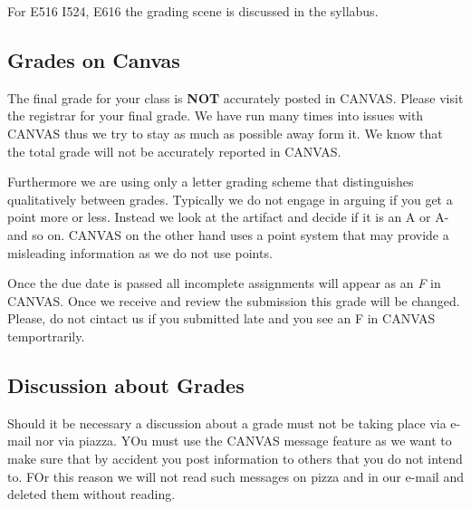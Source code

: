 For E516 I524, E616 the grading scene is discussed in the syllabus.


\subsection{Grades on Canvas}

The final grade for your class is {\bf NOT} accurately posted in
CANVAS. Please visit the registrar for your final grade.
We have run many times into issues with CANVAS thus we try to stay as
much as possible away form it. We know that the total grade will not
be accurately reported in CANVAS.

Furthermore we are using only a letter grading scheme that
distinguishes qualitatively between grades. Typically we do not engage
in arguing if you get a point more or less. Instead we look at the
artifact and decide if it is an A or A- and so on. CANVAS on the other
hand uses a point system that may provide a misleading information as
we do not use points.

Once the due date is passed all incomplete assignments will appear as
an \textit{F} in CANVAS. Once we receive and review the submission this grade will
be changed. Please, do not cintact us if you submitted late and you
see an F in CANVAS temportrarily.

\subsection{Discussion about Grades}

Should it be necessary a discussion about a grade must not be taking
place via e-mail nor via piazza. YOu must use the CANVAS message
feature as we want to make sure that by accident you post information
to others that you do not intend to. FOr this reason we will not read
such messages on pizza and in our e-mail and deleted them without reading.
